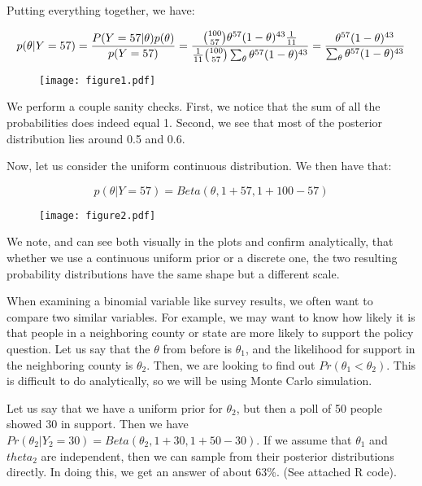 \documentclass[12pt]{article}
\begin{document}
Putting everything together, we have:

$$
p(\theta | Y=57)= \frac{P(Y=57 | \theta)p(\theta)} {p(Y=57)} \\
=\frac{{100 \choose 57} \theta^{57}(1-\theta)^{43} \frac{1}{11}}{\frac{1}{11}{100 \choose 57}   \sum_{\theta} \theta^{57}(1-\theta)^{43}} \\
=\frac{\theta^{57}(1-\theta)^{43}}{\sum_{\theta} \theta^{57}(1-\theta)^{43}}
$$

\begin{figure}
    \centering
    \texttt{[image: figure1.pdf]}
\end{figure}

We perform a couple sanity checks. First, we notice that the sum of all the probabilities does indeed equal 1. Second, we see that most of the posterior distribution lies around 0.5 and 0.6.

Now, let us consider the uniform continuous distribution. We then have that:

$$
p(\theta | Y=57)=Beta(\theta,1+57,1+100-57)
$$

\begin{figure}
    \centering
    \texttt{[image: figure2.pdf]}
\end{figure}

We note, and can see both visually in the plots and confirm analytically, that whether we use a continuous uniform prior or a discrete one, the two resulting probability distributions have the same shape but a different scale.

When examining a binomial variable like survey results, we often want to compare two similar variables. For example, we may want to know how likely it is that people in a neighboring county or state are more likely to support the policy question. Let us say that the $\theta$ from before is $\theta_1$, and the likelihood for support in the neighboring county is $\theta_2$. Then, we are looking to find out $Pr(\theta_1<\theta_2)$. This is difficult to do analytically, so we will be using Monte Carlo simulation.

Let us say that we have a uniform prior for $\theta_2$, but then a poll of 50 people showed 30 in support. Then we have $Pr(\theta_2 | Y_2=30)=Beta(\theta_2,1+30,1+50-30)$. If we assume that $\theta_1$ and $theta_2$ are independent, then we can sample from their posterior distributions directly. In doing this, we get an answer of about 63\%. (See attached R code).
\end{document}
